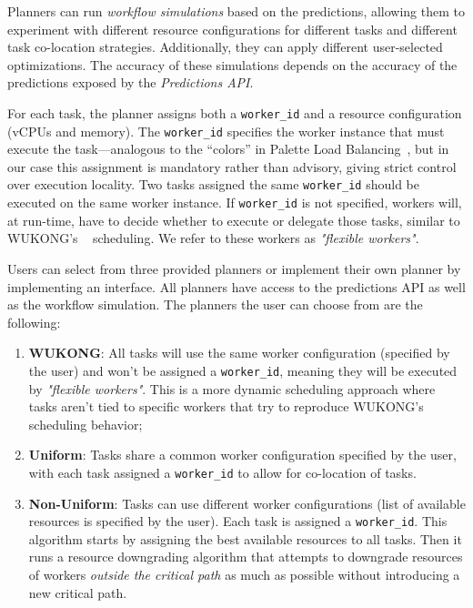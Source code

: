 \documentclass[conference]{IEEEtran}
\begin{document}
Planners can run \textit{workflow simulations} based on the predictions, allowing them to experiment with different resource configurations for different tasks and different task co-location strategies. Additionally, they can apply different user-selected optimizations. The accuracy of these simulations depends on the accuracy of the predictions exposed by the \textit{Predictions API}.

For each task, the planner assigns both a \texttt{worker\_id} and a resource configuration (vCPUs and memory). The \texttt{worker\_id} specifies the worker instance that must execute the task—analogous to the “colors” in Palette Load Balancing~\cite{palette_load_balancing}, but in our case this assignment is mandatory rather than advisory, giving strict control over execution locality. Two tasks assigned the same \texttt{worker\_id} should be executed on the same worker instance. If \texttt{worker\_id} is not specified, workers will, at run-time, have to decide whether to execute or delegate those tasks, similar to WUKONG's ~\cite{wukong_2} scheduling. We refer to these workers as \textit{"flexible workers"}.

Users can select from three provided planners or implement their own planner by implementing an interface. All planners have access to the predictions API as well as the workflow simulation. The planners the user can choose from are the following:

\begin{enumerate}
    \item \textbf{WUKONG}: All tasks will use the same worker configuration (specified by the user) and won't be assigned a \texttt{worker\_id}, meaning they will be executed by \textit{"flexible workers"}. This is a more dynamic scheduling approach where tasks aren't tied to specific workers that try to reproduce WUKONG's scheduling behavior;
    \item \textbf{Uniform}: Tasks share a common worker configuration specified by the user, with each task assigned a \texttt{worker\_id} to allow for co-location of tasks.
    \item \textbf{Non-Uniform}: Tasks can use different worker configurations (list of available resources is specified by the user). Each task is assigned a \texttt{worker\_id}. This algorithm starts by assigning the best available resources to all tasks. Then it runs a resource downgrading algorithm that attempts to downgrade resources of workers \textit{outside the critical path} as much as possible without introducing a new critical path.
\end{enumerate}
\end{document}

